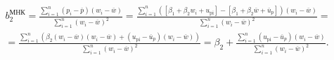 \documentclass[a4paper,12pt]{article}
\begin{document}
\begin{multline}
  b_2^\text{МНК} =
  \frac{\sum\limits_{i=1}^{n}(p_i-\overline{p})(w_i-\overline{w})}{\sum\limits_{i=1}^{n}(w_i-\overline{w})^2} =
  \frac{\sum\limits_{i=1}^{n}([\beta_1+\beta_2w_i+u_\mathrm{pi}]-[\beta_1+\beta_2\overline{w}+\overline{u}_p])(w_i-\overline{w})}{\sum\limits_{i=1}^{n}(w_i-\overline{w})^2} = \\
  =\frac{\sum\limits_{i=1}^{n}(\beta_2(w_i-\overline{w})(w_i-\overline{w})+(u_\mathrm{pi}-\overline{u}_p)(w_i - \overline{w}))}{\sum\limits_{i=1}^{n}(w_i-\overline{w})^2} =
  \beta_2 + \frac{\sum\limits_{i=1}^{n}(u_\mathrm{pi}-\overline{u}_p)(w_i-\overline{w})}{\sum\limits_{i=1}^{n}(w_i-\overline{w})^2}.
\end{multline}
\end{document}

